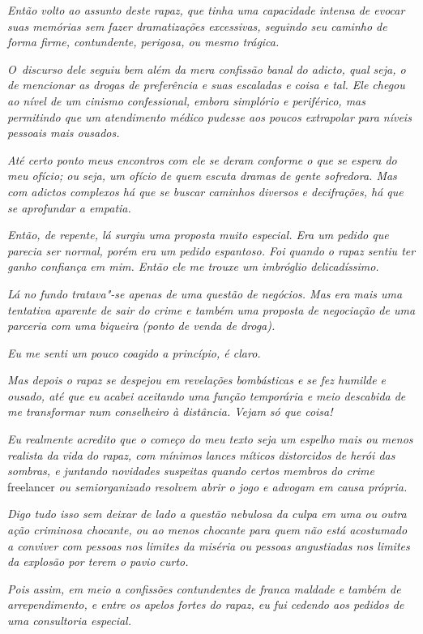\emph{Então volto ao assunto deste rapaz, que tinha uma capacidade
intensa de evocar suas memórias sem fazer dramatizações excessivas,
seguindo seu caminho de forma firme, contundente, perigosa, ou mesmo
trágica.}

\emph{O~discurso dele seguiu bem além da mera confissão banal do adicto,
qual seja, o de mencionar as drogas de preferência e suas escaladas e
coisa e tal. Ele chegou ao nível de um cinismo confessional, embora
simplório e periférico, mas permitindo que um atendimento médico pudesse
aos poucos extrapolar para níveis pessoais mais ousados.}

\emph{Até certo ponto meus encontros com ele se deram conforme o que se
espera do meu ofício; ou seja, um ofício de quem escuta dramas de gente
sofredora. Mas com adictos complexos há que se buscar caminhos diversos
e decifrações, há que se aprofundar a empatia.}

\emph{Então, de repente, lá surgiu uma proposta muito especial. Era um
pedido que parecia ser normal, porém era um pedido espantoso. Foi quando
o rapaz sentiu ter ganho confiança em mim. Então ele me trouxe um
imbróglio delicadíssimo.}

\emph{Lá no fundo tratava"-se apenas de uma questão de negócios. Mas era
mais uma tentativa aparente de sair do crime e também uma proposta de
negociação de uma parceria com uma biqueira (ponto de venda de droga).}

\emph{Eu me senti um pouco coagido a princípio, é claro.}

\emph{Mas depois o rapaz se despejou em revelações bombásticas e se fez
humilde e ousado, até que eu acabei aceitando uma função temporária e
meio descabida de me transformar num conselheiro à distância. Vejam só
que coisa!}

\emph{Eu realmente acredito que o começo do meu texto seja um espelho
mais ou menos realista da vida do rapaz, com mínimos lances míticos
distorcidos de herói das sombras, e juntando novidades suspeitas quando
certos membros do crime} freelancer \emph{ou semiorganizado resolvem abrir o
jogo e advogam em causa própria.}

\emph{Digo tudo isso sem deixar de lado a questão nebulosa da culpa em
uma ou outra ação criminosa chocante, ou ao menos chocante para quem não
está acostumado a conviver com pessoas nos limites da miséria ou pessoas
angustiadas nos limites da explosão por terem o pavio curto.}

\emph{Pois assim, em meio a confissões contundentes de franca maldade e
também de arrependimento, e entre os apelos fortes do rapaz, eu fui
cedendo aos pedidos de uma consultoria especial.}

